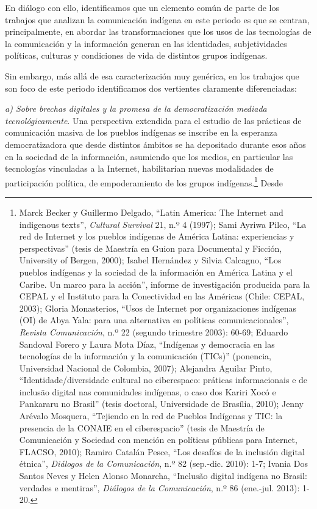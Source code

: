 \documentclass{tufte-handout}
\begin{document}
En diálogo con ello, identificamos que un elemento común de parte de los
trabajos que analizan la comunicación indígena en este periodo es que se
centran, principalmente, en abordar las transformaciones que los usos de
las tecnologías de la comunicación y la información generan en las
identidades, subjetividades políticas, culturas y condiciones de vida de
distintos grupos indígenas.

Sin embargo, más allá de esa caracterización muy genérica, en los
trabajos que son foco de este periodo identificamos dos vertientes
claramente diferenciadas:

\emph{a) Sobre brechas digitales y la promesa de la democratización
mediada tecnológicamente}. Una perspectiva extendida para el estudio de
las prácticas de comunicación masiva de los pueblos indígenas se
inscribe en la esperanza democratizadora que desde distintos ámbitos se
ha depositado durante esos años en la sociedad de la información,
asumiendo que los medios, en particular las tecnologías vinculadas a la
Internet, habilitarían nuevas modalidades de participación política, de
empoderamiento de los grupos indígenas.\footnote{Marck Becker y
  Guillermo Delgado, ``Latin America: The Internet and indigenous
  texts'', \emph{Cultural Survival} 21, n.º 4 (1997);
  Sami Ayriwa Pilco, ``La red de Internet y los pueblos indígenas de
  América Latina: experiencias y perspectivas'' (tesis de Maestría en
  Guion para Documental y Ficción, University of Bergen, 2000); Isabel
  Hernández y Silvia Calcagno, ``Los pueblos indígenas y la sociedad de
  la información en América Latina y el Caribe. Un marco para la
  acción'', informe de investigación producida para la CEPAL y el
  Instituto para la Conectividad en las Américas (Chile: CEPAL, 2003);
  Gloria Monasterios, ``Usos de Internet por organizaciones indígenas
  (OI) de Abya Yala: para una alternativa en políticas
  comunicacionales'', \emph{Revista Comunicación}, n.º 22 (segundo
  trimestre 2003): 60-69; Eduardo Sandoval Forero y Laura Mota Díaz,
  ``Indígenas y democracia en las tecnologías de la información y la
  comunicación (TICs)'' (ponencia, Universidad Nacional de Colombia,
  2007); Alejandra Aguilar Pinto, ``Identidade/diversidade cultural no
  ciberespaco: práticas informacionais e de inclusão digital nas
  comunidades indígenas, o caso dos Kariri Xocó e Pankararu no Brasil''
  (tesis doctoral, Universidade de Brasília, 2010); Jenny Arévalo
  Mosquera, ``Tejiendo en la red de Pueblos Indígenas y TIC: la
  presencia de la CONAIE en el ciberespacio'' (tesis de Maestría de
  Comunicación y Sociedad con mención en políticas públicas para
  Internet, FLACSO, 2010); Ramiro
  Catalán Pesce, ``Los desafíos de la inclusión digital étnica'',
  \emph{Diálogos de la Comunicación}, n.º 82 (sep.-dic. 2010): 1-7; Ivania
  Dos Santos Neves y Helen Alonso Monarcha, ``Inclusão digital indígena
  no Brasil: verdades e mentiras'', \emph{Diálogos de la Comunicación},
  n.º 86 (ene.-jul. 2013): 1-20.} Desde
\end{document}
